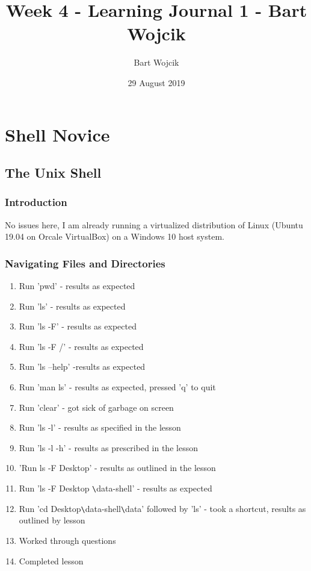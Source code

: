\documentclass{article}
\title{Week 4 - Learning Journal 1  - Bart Wojcik}
\author{Bart Wojcik}
\date{29 August 2019}
\begin{document}
\maketitle

\section{Shell Novice}
\subsection{The Unix Shell}
\subsubsection{Introduction}
No issues here, I am already running a virtualized distribution of Linux (Ubuntu 19.04 on Orcale VirtualBox) on a Windows 10 host system.
\subsubsection{Navigating Files and Directories}
\begin{enumerate}
    \item Run 'pwd' - results as expected
    \item Run 'ls' - results as expected
    \item Run 'ls -F' - results as expected
    \item Run 'ls -F /' - results as expected
    \item Run 'ls --help' -results as expected
    \item Run 'man ls' - results as expected, pressed 'q' to quit
    \item Run 'clear' - got sick of garbage on screen
    \item Run 'ls -l' - results as specified in the lesson
    \item Run 'ls -l -h' - results as prescribed in the lesson
    \item 'Run ls -F Desktop' - results as outlined in the lesson
    \item Run 'ls -F Desktop \verb|\|data-shell' - results as expected
    \item Run 'cd Desktop\verb|\|data-shell\verb|\|data' followed by 'ls' - took a shortcut, results as outlined by lesson
    \item Worked through questions
    \item Completed lesson
\end{enumerate}
\end{document}
